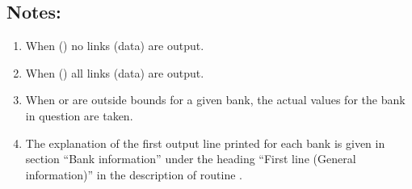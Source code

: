 \subsection*{Notes:}
\par
\begin{enumerate}
\item When  () no links (data) are output.
\item When  () all links (data) are
output.
\item When  or  are outside bounds for a given bank, the
actual values for the bank in question are taken.
\item The explanation of the
first output line printed for each bank is given in section ``Bank information''
under the heading ``First line (General information)'' in the
description of routine .
\end{enumerate}
\newpage
\mbox{}\vspace*{-1cm}
